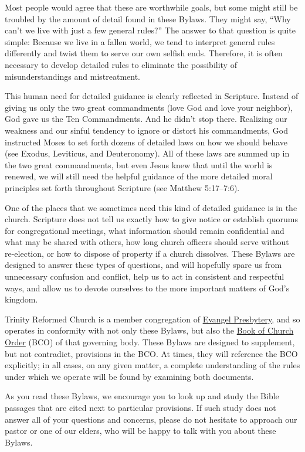 \documentclass[
]{book}
\begin{document}
Most people would agree that these are worthwhile goals, but some might still be troubled by the amount of detail found in these Bylaws. They might say, ``Why can't we live with just a few general rules?'' The answer to that question is quite simple: Because we live in a fallen world, we tend to interpret general rules differently and twist them to serve our own selfish ends. Therefore, it is often necessary to develop detailed rules to eliminate the possibility of misunderstandings and mistreatment.

This human need for detailed guidance is clearly reflected in Scripture. Instead of giving us only the two great commandments (love God and love your neighbor), God gave us the Ten Commandments. And he didn't stop there. Realizing our weakness and our sinful tendency to ignore or distort his commandments, God instructed Moses to set forth dozens of detailed laws on how we should behave (see Exodus, Leviticus, and Deuteronomy). All of these laws are summed up in the two great commandments, but even Jesus knew that until the world is renewed, we will still need the helpful guidance of the more detailed moral principles set forth throughout Scripture (see Matthew 5:17--7:6).

One of the places that we sometimes need this kind of detailed guidance is in the church. Scripture does not tell us exactly how to give notice or establish quorums for congregational meetings, what information should remain confidential and what may be shared with others, how long church officers should serve without re-election, or how to dispose of property if a church dissolves. These Bylaws are designed to answer these types of questions, and will hopefully spare us from unnecessary confusion and conflict, help us to act in consistent and respectful ways, and allow us to devote ourselves to the more important matters of God's kingdom.

Trinity Reformed Church is a member congregation of \href{https://evangelpresbytery.com}{Evangel Presbytery}, and so operates in conformity with not only these Bylaws, but also the \href{https://bco.evangelpresbytery.com}{Book of Church Order} (BCO) of that governing body. These Bylaws are designed to supplement, but not contradict, provisions in the BCO. At times, they will reference the BCO explicitly; in all cases, on any given matter, a complete understanding of the rules under which we operate will be found by examining both documents.

As you read these Bylaws, we encourage you to look up and study the Bible passages that are cited next to particular provisions. If such study does not answer all of your questions and concerns, please do not hesitate to approach our pastor or one of our elders, who will be happy to talk with you about these Bylaws.
\end{document}

